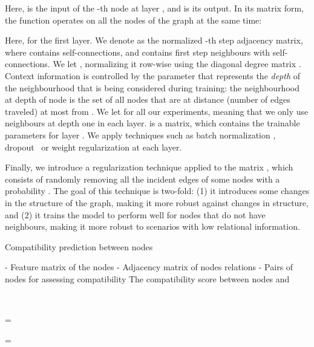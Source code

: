 \documentclass[10pt,twocolumn,letterpaper]{article}
\begin{document}
Here,  is the input of the -th node at layer , and  is its output.
In its matrix form, the function operates on all the nodes of the graph at the same time:



Here,  for the first layer. We denote  as the normalized -{th} step adjacency matrix, where  contains self-connections, and  contains first step neighbours with self-connections. We let , normalizing it row-wise using the diagonal degree matrix . 
Context information is controlled by the parameter  that represents the \emph{depth} of the neighbourhood that is being considered during training: the neighbourhood at depth  of node  is the set of all nodes that are at distance (number of edges traveled) at most  from . We let  for all our experiments, meaning that we only use neighbours at depth one in each layer.  is a  matrix, which contains the trainable parameters for layer . 
We apply techniques such as batch normalization \cite{ioffe2015batch}, dropout~\cite{srivastava2014dropout} or weight regularization at each layer.

Finally, we introduce a regularization technique applied to the matrix , which consists of randomly removing all the incident edges of some nodes with a probability . The goal of this technique is two-fold: (1) it introduces some changes in the structure of the graph, making it more robust against changes in structure, and (2) it trains the model to perform well for nodes that do not have neighbours, making it more robust to scenarios with low relational information. 

\begin{algorithm}[t]
\caption{Compatibility prediction between nodes}
\label{alg:method}
\begin{algorithmic}[1]
\Input
\Statex  - Feature matrix of the nodes
\Statex  - Adjacency matrix of nodes relations
\Statex  - Pairs of nodes for assessing compatibility
\Output The compatibility score  between nodes  and 

\Statex ~
\State  {}
\State  {}

\State   = 

\State   = 

\Statex ~

  \State 
  \State  {}
  \State 
        \State 
    \EndFor
  \State \Return 
\EndFunction
\Statex ~
  \State \Return 
\EndFunction


\end{algorithmic}
\end{algorithm}
\end{document}
